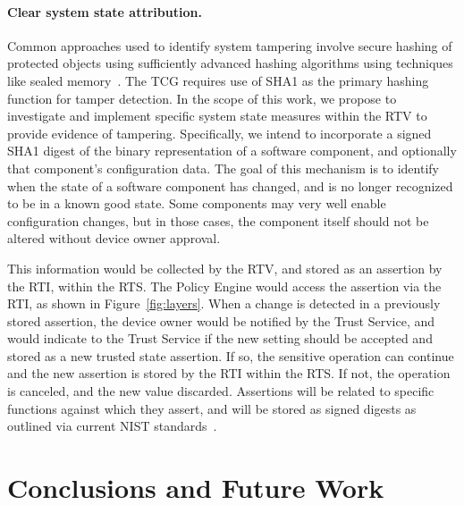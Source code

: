 \documentclass[10pt,letterpaper]{article}
\begin{document}
\paragraph{Clear system state attribution.}  Common approaches used to identify system tampering involve secure hashing of protected objects using sufficiently advanced hashing algorithms using techniques like sealed memory~\cite{TPMSpec}. The TCG requires use of SHA1 as the primary hashing function for tamper detection.  In the scope of this work, we propose to investigate and implement specific system state measures within the RTV to provide evidence of tampering.  Specifically, we intend to incorporate a signed SHA1 digest of the binary representation of a software component, and optionally that component's configuration data.  The goal of this mechanism is to identify when the state of a software component has changed, and is no longer recognized to be in a known good state.  Some components may very well enable configuration changes, but in those cases, the component itself should not be altered without device owner approval.

This information would be collected by the RTV, and stored as an assertion by the RTI, within the RTS.  The Policy Engine would access the assertion via the RTI, as shown in Figure~\ref{fig:layers}.  When a change is detected in a previously stored assertion, the device owner would be notified by the Trust Service, and would indicate to the Trust Service if the new setting should be accepted and stored as a new trusted state assertion.  If so, the sensitive operation can continue and the new assertion is stored by the RTI within the RTS.  If not, the operation is canceled, and the new value discarded.  Assertions will be related to specific functions against which they assert, and will be stored as signed digests as outlined via current NIST standards~\cite{NIST-SP-800-164}.

\section{Conclusions and Future Work}



\end{document}
